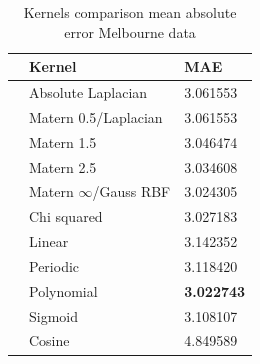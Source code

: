 \begin{table}[!h]
    \caption{Kernels comparison mean absolute error Melbourne data}
    \label{tab:kernel mae comparison}
    \begin{center}
    \begin{tabular}{lll}
        \toprule
         & Kernel & MAE \\
        \midrule
        & Absolute Laplacian &  3.061553 \\
        & Matern 0.5/Laplacian &  3.061553 \\
        & Matern 1.5 &  3.046474 \\
        & Matern 2.5 &  3.034608 \\
        & Matern $\infty$/Gauss RBF &  3.024305 \\
        & Chi squared &    3.027183    \\
        & Linear &     3.142352\\
        & Periodic  & 3.118420 \\
        & Polynomial &     \textbf{3.022743} \\
        & Sigmoid &      3.108107       \\
        & Cosine &    4.849589 \\
        \bottomrule
        \end{tabular}
    \end{center}
    \end{table}  



